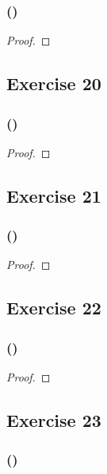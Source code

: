 \documentclass[14pt]{extarticle}
\begin{document}
\subsubsection{()}

\begin{proof}

\end{proof}

\subsection{Exercise 20}

\subsubsection{()}

\begin{proof}

\end{proof}

\subsection{Exercise 21}

\subsubsection{()}

\begin{proof}

\end{proof}

\subsection{Exercise 22}

\subsubsection{()}

\begin{proof}

\end{proof}

\subsection{Exercise 23}

\subsubsection{()}
\end{document}
